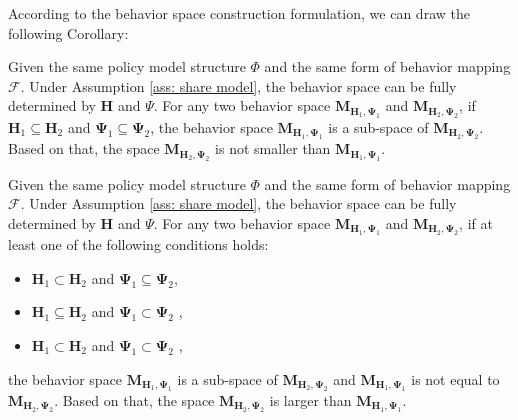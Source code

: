According to the behavior space construction formulation, we can draw the following Corollary:
\begin{Corollary}
\label{Corollary: space not smaller}
        Given the same policy model structure $\Phi$ and the same form of behavior mapping  $\mathcal{F}$. Under Assumption \ref{ass: share model}, the behavior space can be fully determined by $\textbf{H}$ and $\Psi$.  For any two behavior space $\mathbf{M}_{\mathbf{H}_1,\bm{\Psi}_1}$ and $\mathbf{M}_{\mathbf{H}_2,\bm{\Psi}_2}$, if $\mathbf{H}_1 \subseteq \mathbf{H}_2$ and $\bm{\Psi}_1 \subseteq \bm{\Psi}_2$, the behavior space $\mathbf{M}_{\mathbf{H}_1,\bm{\Psi}_1}$ is a sub-space of $\mathbf{M}_{\mathbf{H}_2,\bm{\Psi}_2}$. Based on that, the space $\mathbf{M}_{\mathbf{H}_2,\bm{\Psi}_2}$  is not smaller than  $\mathbf{M}_{\mathbf{H}_1,\bm{\Psi}_1}$.
\end{Corollary}

\begin{Corollary}
\label{Corollary: space larger}
        Given the same policy model structure $\Phi$ and the same form of behavior mapping  $\mathcal{F}$. Under Assumption \ref{ass: share model}, the behavior space can be fully determined by $\textbf{H}$ and $\Psi$.  For any two behavior space $\mathbf{M}_{\mathbf{H}_1,\bm{\Psi}_1}$ and $\mathbf{M}_{\mathbf{H}_2,\bm{\Psi}_2}$, if at least one of the following conditions holds: 
        \begin{itemize}
            \item $\mathbf{H}_1 \subset \mathbf{H}_2$ and $\bm{\Psi}_1 \subseteq \bm{\Psi}_2$, 
            \item $\mathbf{H}_1 \subseteq \mathbf{H}_2$ and $\bm{\Psi}_1 \subset \bm{\Psi}_2$ ,
            \item $\mathbf{H}_1 \subset \mathbf{H}_2$ and $\bm{\Psi}_1 \subset \bm{\Psi}_2$ ,
        \end{itemize}
        the behavior space $\mathbf{M}_{\mathbf{H}_1,\bm{\Psi}_1}$ is a sub-space of $\mathbf{M}_{\mathbf{H}_2,\bm{\Psi}_2}$ and $\mathbf{M}_{\mathbf{H}_1,\bm{\Psi}_1}$ is not equal to $\mathbf{M}_{\mathbf{H}_2,\bm{\Psi}_2}$. Based on that, the space $\mathbf{M}_{\mathbf{H}_2,\bm{\Psi}_2}$  is larger than  $\mathbf{M}_{\mathbf{H}_1,\bm{\Psi}_1}$.
\end{Corollary}



\clearpage
















